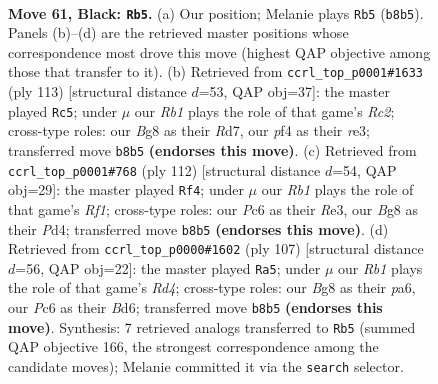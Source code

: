 \documentclass[11pt]{article}
\begin{document}
\clearpage

\begin{figure}[p]\centering
\begin{subfigure}{0.46\textwidth}\centering
\resizebox{\linewidth}{!}{%
\newchessgame
\chessboard[
  setfen={1r4b1/p1pk2r1/P1p3p1/2P2p1p/RP3P1P/6R1/5K2/1N6 b - - 45 61},
  showmover=false,
  pgfstyle=straightmove, color=movearrow, markmove={b8-b5}
]}
\caption{}
\end{subfigure}\hfill
\begin{subfigure}{0.46\textwidth}\centering
\resizebox{\linewidth}{!}{%
\newchessgame
\chessboard[
  setfen={8/kprr4/p5p1/P4p2/1RP2PpP/4R1P1/4K3/8 b - - 13 57},
  showmover=false,
  pgfstyle=straightmove, color=movearrow, markmove={c7-c5}
]}
\caption{}
\end{subfigure}
\\[4pt]
\begin{subfigure}{0.46\textwidth}\centering
\resizebox{\linewidth}{!}{%
\newchessgame
\chessboard[
  setfen={6r1/p1r2p1k/7p/3p3P/1p1P2P1/1P2R3/P7/1K3R2 w - - 8 57},
  showmover=false,
  pgfstyle=straightmove, color=movearrow, markmove={f1-f4}
]}
\caption{}
\end{subfigure}\hfill
\begin{subfigure}{0.46\textwidth}\centering
\resizebox{\linewidth}{!}{%
\newchessgame
\chessboard[
  setfen={2r5/8/Pp1bk1p1/3rp2p/P1p1R3/2P2P1P/R2BK1P1/8 b - - 0 54},
  showmover=false,
  pgfstyle=straightmove, color=movearrow, markmove={d5-a5}
]}
\caption{}
\end{subfigure}
\caption{\textbf{Move 61, Black: \texttt{Rb5}.} (a) Our position; Melanie plays \texttt{Rb5} (\texttt{b8b5}). Panels (b)--(d) are the retrieved master positions whose correspondence most drove this move (highest QAP objective among those that transfer to it). (b) Retrieved from \texttt{ccrl\_top\_p0001\#1633} (ply 113) [structural distance $d$=53, QAP obj=37]: the master played \texttt{Rc5}; under $\mu$ our \emph{Rb1} plays the role of that game's \emph{Rc2}; cross-type roles: our \emph{B}g8 as their \emph{R}d7, our \emph{p}f4 as their \emph{r}e3; transferred move \texttt{b8b5} \textbf{(endorses this move)}. (c) Retrieved from \texttt{ccrl\_top\_p0001\#768} (ply 112) [structural distance $d$=54, QAP obj=29]: the master played \texttt{Rf4}; under $\mu$ our \emph{Rb1} plays the role of that game's \emph{Rf1}; cross-type roles: our \emph{P}c6 as their \emph{R}e3, our \emph{B}g8 as their \emph{P}d4; transferred move \texttt{b8b5} \textbf{(endorses this move)}. (d) Retrieved from \texttt{ccrl\_top\_p0000\#1602} (ply 107) [structural distance $d$=56, QAP obj=22]: the master played \texttt{Ra5}; under $\mu$ our \emph{Rb1} plays the role of that game's \emph{Rd4}; cross-type roles: our \emph{B}g8 as their \emph{p}a6, our \emph{P}c6 as their \emph{B}d6; transferred move \texttt{b8b5} \textbf{(endorses this move)}. Synthesis: 7 retrieved analogs transferred to \texttt{Rb5} (summed QAP objective 166, the strongest correspondence among the candidate moves); Melanie committed it via the \texttt{search} selector.}
\label{fig:thought-m121}
\end{figure}
\end{document}

